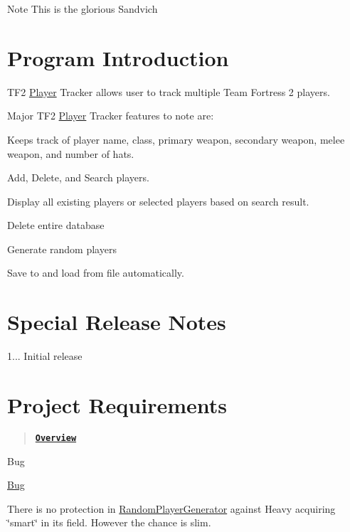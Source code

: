 \begin{DoxyNote}{Note}
This is the glorious Sandvich 
\end{DoxyNote}
\hypertarget{index_intro}{}\section{Program Introduction}\label{index_intro}
T\+F2 \hyperlink{class_player}{Player} Tracker allows user to track multiple Team Fortress 2 players.

Major T\+F2 \hyperlink{class_player}{Player} Tracker features to note are\+:


\begin{DoxyItemize}
\item Keeps track of player name, class, primary weapon, secondary weapon, melee weapon, and number of hats.
\item Add, Delete, and Search players.
\item Display all existing players or selected players based on search result.
\item Delete entire database
\item Generate random players
\item Save to and load from file automatically.
\end{DoxyItemize}



 \hypertarget{index_notes}{}\section{Special Release Notes}\label{index_notes}

\begin{DoxyItemize}
\item 1... Initial release
\end{DoxyItemize}



 \hypertarget{index_requirements}{}\section{Project Requirements}\label{index_requirements}
\begin{quote}
\href{DS-OOP-Project.pdf}{\tt {\bfseries Overview}} \end{quote}




 \begin{DoxyRefDesc}{Bug}
\item[\hyperlink{bug__bug000001}{Bug}]
\begin{DoxyItemize}
\item There is no protection in \hyperlink{class_random_player_generator}{Random\+Player\+Generator} against Heavy acquiring \char`\"{}smart\char`\"{} in its field. However the chance is slim.
\end{DoxyItemize}\end{DoxyRefDesc}




